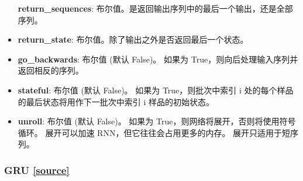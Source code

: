 \begin{itemize}
  \textbf{return\_sequences}:
  布尔值。是返回输出序列中的最后一个输出，还是全部序列。
\item
  \textbf{return\_state}: 布尔值。除了输出之外是否返回最后一个状态。
\item
  \textbf{go\_backwards}: 布尔值 (默认 False)。 如果为
  True，则向后处理输入序列并返回相反的序列。
\item
  \textbf{stateful}: 布尔值 (默认 False)。 如果为 True，则批次中索引 i
  处的每个样品 的最后状态将用作下一批次中索引 i 样品的初始状态。
\item
  \textbf{unroll}: 布尔值 (默认 False)。 如果为
  True，则网络将展开，否则将使用符号循环。 展开可以加速
  RNN，但它往往会占用更多的内存。 展开只适用于短序列。
\end{itemize}


\subsubsection{GRU {\href{https://github.com/keras-team/keras/blob/master/keras/layers/recurrent.py\#L1426}{{[}source{]}}}}

